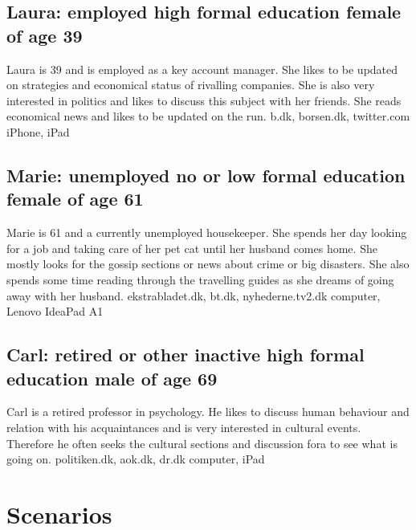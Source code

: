\subsection{Laura: employed high formal education female of age 39}
Laura is 39 and is employed as a key account manager. She likes to be updated on strategies and economical status of rivalling companies. She is also very interested in politics and likes to discuss this subject with her friends. She reads economical news and likes to be updated on the run.
b.dk, borsen.dk, twitter.com
iPhone, iPad

\subsection{Marie: unemployed no or low formal education female of age 61}
Marie is 61 and a currently unemployed housekeeper. She spends her day looking for a job and taking care of her pet cat until her husband comes home. She mostly looks for the gossip sections or news about crime or big disasters. She also spends some time reading through the travelling guides as she dreams of going away with her husband.
ekstrabladet.dk, bt.dk, nyhederne.tv2.dk
computer, Lenovo IdeaPad A1

\subsection{Carl: retired or other inactive high formal education male of age 69}
Carl is a retired professor in psychology. He likes to discuss human behaviour and relation with his acquaintances and is very interested in cultural events. Therefore he often seeks the cultural sections and discussion fora to see what is going on. 
politiken.dk, aok.dk, dr.dk
computer, iPad

\section{Scenarios}
